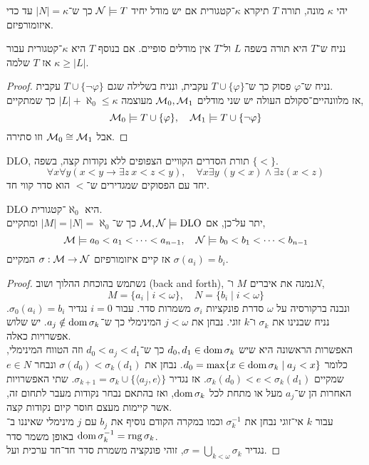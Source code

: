 \begin{definition}[קטגוריות]
	יהי $\kappa$ מונה, תורה $T$ תיקרא $\kappa$־קטגורית אם יש מודל יחיד $\mathcal{N} \models T$ כך ש־$|N| = \kappa$ עד כדי איזומורפיזם.
\end{definition}
\begin{theorem}
	נניח ש־$T$ היא תורה בשפה $L$ ול־$T$ אין מודלים סופיים.
	אם בנוסף $T$ היא $\kappa$־קטגורית עבור $\kappa \ge |L|$ אז $T$ שלמה.
\end{theorem}
\begin{proof}
	נניח ש־$\varphi$ פסוק כך ש־$T \cup \{ \varphi \}$ עקבית, ונניח בשלילה שגם $T \cup \{ \lnot \varphi \}$ עקבית. \\
	אז מלוונהיים־סקולם העולה יש שני מודלים $\mathcal{M}_0, \mathcal{M}_1$ מעוצמה $|L| + \aleph_0 \le \kappa$ כך שמתקיים,
	\[
		\mathcal{M}_0 \models T \cup \{ \varphi \},
		\quad
		\mathcal{M}_1 \models T \cup \{ \lnot \varphi \}
	\]
	אבל $\mathcal{M}_0 \cong \mathcal{M}_1$ וזו סתירה.
\end{proof}
\begin{example}
	DLO, תורת הסדרים הקוויים הצפופים ללא נקודות קצה, בשפה $\{ < \}$.
	\[
		\forall x \forall y (x < y \to \exists z\ x < z < y),
		\quad
		\forall x \exists y\ (y < x) \land \exists z (x < z)
	\]
	יחד עם הפסוקים שמגדירים ש־$<$ הוא סדר קווי חד.
\end{example}
\begin{theorem}[קנטור]
	DLO היא $\aleph_0$־קטגורית. \\
	יתר על־כן, אם $\mathcal{M}, \mathcal{N} \models \operatorname{DLO}$ כך ש־$|M| = |N| = \aleph_0$ ומתקיים,
	\[
		\mathcal{M} \models a_0 < a_1 < \cdots < a_{n - 1},
		\quad
		\mathcal{N} \models b_0 < b_1 < \cdots < b_{n - 1}
	\]
	אז קיים איזומורפיזם $\sigma : \mathcal{M} \to \mathcal{N}$ המקיים $\sigma(a_i) = b_i$.
\end{theorem}
\begin{proof}
	נשתמש בהוכחת ההלוך ושוב (back and forth), נמנה את איברים $M$ ו־$N$,
	\[
		M = \{ a_i \mid i < \omega \},
		\quad
		N = \{ b_i \mid i < \omega \}
	\]
	ונבנה ברקורסיה על $\omega$ סדרת פונקציות $\sigma_i$ משמרות סדר.
	עבור $i = 0$ נגדיר $\sigma_0(a_i) = b_i$.
	נניח שבנינו את $\sigma_k$ ו־$k$ זוגי.
	נבחן את $j < \omega$ המינימלי כך ש־$a_j \notin \operatorname{dom} \sigma_k$.
	יש שלוש אפשרויות כאלה. \\
	האפשרות הראשונה היא שיש $d_0, d_1 \in \operatorname{dom} \sigma_k$ כך ש־$d_0 < a_j < d_1$ וזה הטווח המינימלי, כלומר $d_0 = \max\{ x \in \operatorname{dom} \sigma_k \mid a_j < x \}$.
	נבחן את $\sigma(d_0) < \sigma_k(d_1)$ ונבחר $e \in N$ שמקיים $\sigma_k(d_0) < e < \sigma_k(d_1)$.
	אז נגדיר $\sigma_{k + 1} = \sigma_k \cup \{ \langle a_j, e \rangle \}$.
	שתי האפשרויות האחרות הן ש־$a_j$ מעל או מתחת לכל $\operatorname{dom} \sigma_k$, ואז בהתאם נבחר נקודות מעבר לתחום זה, אשר קיימות מעצם חוסר קיום נקודות קצה. \\
	עבור $k$ אי־זוגי נבחן את $\sigma_k^{-1}$ וכמו במקרה הקודם נוסיף את $b_j$ עם $j$ מינימלי שאיננו ב־$\operatorname{dom} \sigma_k^{-1} = \operatorname{rng} \sigma_k$ באופן משמר סדר. \\
	נגדיר $\sigma = \bigcup_{k < \omega} \sigma_k$, זוהי פונקציה משמרת סדר חד־חד ערכית ועל.
\end{proof}

